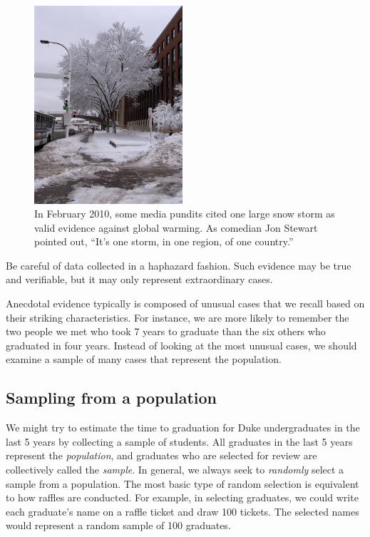 \setlength{\captionwidth}{\textwidth-80mm}
\begin{figure}
\centering
\hspace{8mm}\includegraphics[width=55mm]{ch_intro_to_data/figures/mnWinter/mnWinter}\hspace{4mm}
\begin{minipage}[b]{\textwidth - 80mm}
   \caption[anecdotal evidence]{In February 2010, some media pundits cited one large snow storm as valid evidence against global warming. As comedian Jon Stewart pointed out, ``It's one storm, in one region, of one country.''
   \label{mnWinter}}
\end{minipage}
\end{figure}
\setlength{\captionwidth}{\mycaptionwidth}

\begin{termBox}{
Be careful of data collected in a haphazard fashion. Such evidence may be true and verifiable, but it may only represent extraordinary cases.}
\end{termBox}

Anecdotal evidence typically is composed of unusual cases that we recall based on their striking characteristics. For instance, we are more likely to remember the two people we met who took 7 years to graduate than the six others who graduated in four years. Instead of looking at the most unusual cases, we should examine a sample of many cases that represent the population.

\subsection{Sampling from a population}


We might try to estimate the time to graduation for Duke undergraduates in the last 5 years by collecting a sample of students. All graduates in the last 5 years represent the \emph{population}, and graduates who are selected for review are collectively called the \emph{sample}. In general, we always seek to \emph{randomly} select a sample from a population. The most basic type of random selection is equivalent to how raffles are conducted. For example, in selecting graduates, we could write each graduate's name on a raffle ticket and draw 100 tickets. The selected names would represent a random sample of 100 graduates.

